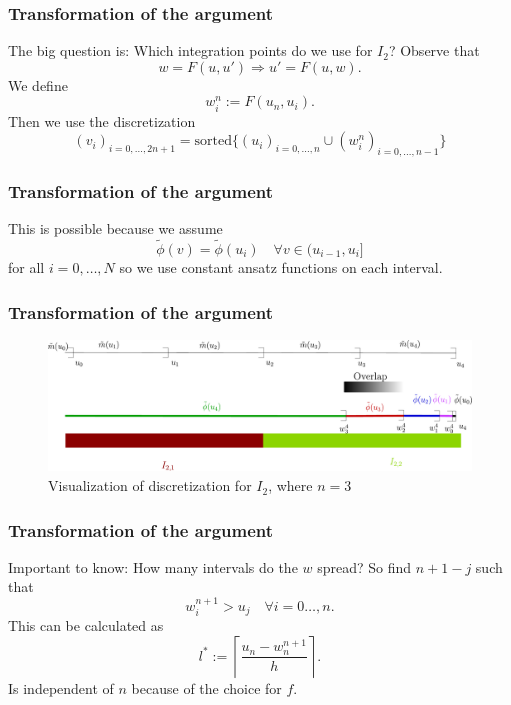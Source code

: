 \documentclass[12pt,a4paper,handout]{beamer}
\theoremstyle{definition}
\theoremstyle{plain}
\begin{document}
\begin{frame}
    \frametitle{Transformation of the argument}
    The big question is: Which integration points do we use for $I_2$? Observe that
    \begin{equation*}
        w=F(u,u')\Rightarrow u'=F(u,w).
    \end{equation*}
    We define 
    \begin{equation*}
        w_{i}^{n}:=F(u_n,u_i).
    \end{equation*}
    Then we use the discretization 
    \begin{equation*}
        (v_i)_{i=0,\dotsc,2n+1}=\text{sorted}\{(u_i)_{i=0,\dotsc,n}\cup (w^n_{i})_{i=0,\dotsc,n-1}\}
    \end{equation*}
\end{frame}
\begin{frame}
    \frametitle{Transformation of the argument}
    This is possible because we assume
    \begin{equation*}
        \tilde\phi(v)=\tilde{\phi}(u_i)\quad\forall v\in (u_{i-1},u_i]
    \end{equation*}
    for all $i=0,\dotsc,N$ so we use constant ansatz functions on each interval.
\end{frame}
\begin{frame}
\frametitle{Transformation of the argument}
    \begin{figure}
        \centering
        \includegraphics[width=\textwidth]{I2ls2}
        \caption{Visualization of discretization for $I_2$, where $n=3$}
        \label{fig:vis1}
    \end{figure}
\end{frame}
\begin{frame}
\frametitle{Transformation of the argument}
    Important to know: How many intervals do the $w$ spread? So find $n+1-j$ such that 
    \begin{equation*}
        w^{n+1}_i>u_j \quad\forall i=0\dotsc,n.
    \end{equation*}
    This can be calculated as
    \begin{equation*}
    l^*:=\left\lceil  \frac{u_n -w_{n}^{n+1}}{h}\right\rceil.
    \end{equation*}
    Is independent of $n$ because of the choice for $f$.
\end{frame}
\end{document}
